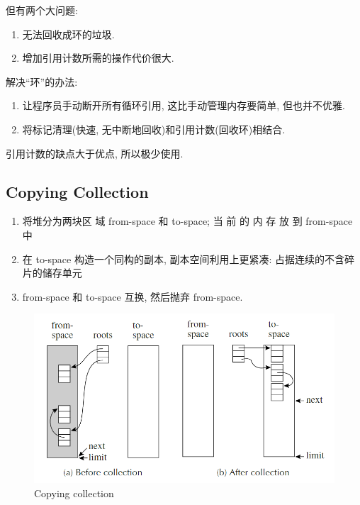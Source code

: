 但有两个大问题:
\begin{enumerate}
    \item 无法回收成环的垃圾.
    \item 增加引用计数所需的操作代价很大.
\end{enumerate}

解决``环''的办法:
\begin{enumerate}
    \item 让程序员手动断开所有循环引用, 这比手动管理内存要简单, 但也并不优雅.
    \item 将标记清理(快速, 无中断地回收)和引用计数(回收环)相结合.
\end{enumerate}

引用计数的缺点大于优点, 所以极少使用. 

\subsection{Copying Collection}
\begin{enumerate}
    \item 将堆分为两块区 域 from-space 和 to-space; 当 前 的 内 存 放 到 from-space 中 
    \item 在 to-space 构造一个同构的副本, 副本空间利用上更紧凑: 占据连续的不含碎片的储存单元
    \item from-space 和 to-space 互换, 然后抛弃 from-space. 
\end{enumerate}

\begin{figure}[H]
    \centering
    \includegraphics[width=0.84\linewidth]{pic/CP13/Copying collection}
    \caption{Copying collection}
\end{figure}

